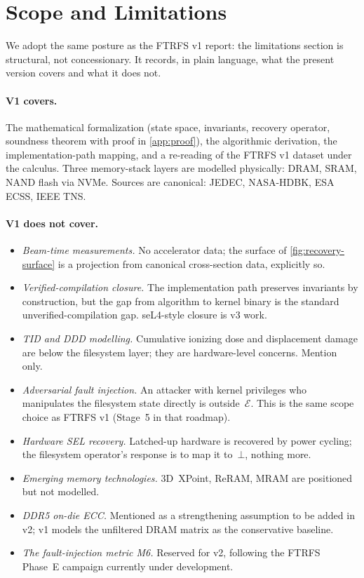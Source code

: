 \section{Scope and Limitations}\label{sec:limits}

We adopt the same posture as the FTRFS v1 report: the limitations
section is structural, not concessionary. It records, in plain
language, what the present version covers and what it does not.

\paragraph{V1 covers.}
The mathematical formalization (state space, invariants, recovery
operator, soundness theorem with proof in \cref{app:proof}), the
algorithmic derivation, the implementation-path mapping, and a
re-reading of the FTRFS v1 dataset under the calculus. Three
memory-stack layers are modelled physically: DRAM, SRAM, NAND flash
via NVMe. Sources are canonical: JEDEC, NASA-HDBK, ESA ECSS,
IEEE TNS.

\paragraph{V1 does not cover.}
\begin{itemize}
\item \emph{Beam-time measurements.} No accelerator data; the surface
  of \cref{fig:recovery-surface} is a projection from canonical
  cross-section data, explicitly so.
\item \emph{Verified-compilation closure.} The implementation path
  preserves invariants by construction, but the gap from
  algorithm to kernel binary is the standard
  unverified-compilation gap. seL4-style closure is v3 work.
\item \emph{TID and DDD modelling.} Cumulative ionizing dose and
  displacement damage are below the filesystem layer; they are
  hardware-level concerns. Mention only.
\item \emph{Adversarial fault injection.} An attacker with kernel
  privileges who manipulates the filesystem state directly is
  outside~\(\mathcal{E}\). This is the same scope choice as
  FTRFS v1 (Stage~5 in that roadmap).
\item \emph{Hardware SEL recovery.} Latched-up hardware is recovered
  by power cycling; the filesystem operator's response is to map
  it to~\(\bot\), nothing more.
\item \emph{Emerging memory technologies.} 3D~XPoint, ReRAM, MRAM
  are positioned but not modelled.
\item \emph{DDR5 on-die ECC.} Mentioned as a strengthening
  assumption to be added in v2; v1 models the unfiltered DRAM
  matrix as the conservative baseline.
\item \emph{The fault-injection metric M6.} Reserved for v2,
  following the FTRFS Phase~E campaign currently under
  development.
\end{itemize}

